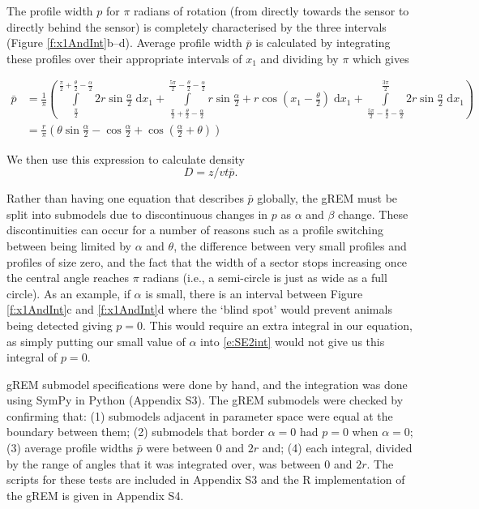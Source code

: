 \documentclass[a4paper,10pt,reqno,oneside]{amsart}
\begin{document}
The profile width $p$ for $\pi$ radians of rotation (from directly towards the sensor to directly behind the sensor) is completely characterised by the three intervals (Figure \ref{f:x1AndInt}b--d). Average profile width $\bar{p}$ is calculated by integrating these profiles over their appropriate intervals of $x_1$ and dividing by $\pi$ which gives

\begin{align}
    \bar{p} &=\frac{1}{\pi} \left(\int\limits_{\frac{\pi}{2}}^{\frac{\pi}{2} + \frac{\theta}{2} - \frac{\alpha}{2}}2 r \sin{\frac{\alpha}{2} }\;\mathrm{d}x_1+\int\limits_{\frac{\pi}{2} + \frac{\theta}{2} - \frac{\alpha}{2}}^{\frac{5 \pi}{2} - \frac{\theta}{2} - \frac{\alpha}{2}}r \sin{\frac{\alpha}{2} } + r \cos{\left (x_1 - \frac{\theta}{2} \right )}\;\mathrm{d}x_1+\int\limits_{\frac{5 \pi}{2} - \frac{\theta}{2} - \frac{\alpha}{2}}^{\frac{3 \pi}{2}}2 r \sin{\frac{\alpha}{2} }\;\mathrm{d}x_1\right) \label{e:SE2int}  \\
     &= \frac{r}{\pi} \left(\theta \sin{\frac{\alpha}{2} } - \cos{\frac{\alpha}{2} } + \cos{\left (\frac{\alpha}{2} + \theta \right )}\right) \label{e:SE2result}
\end{align}

We then use this expression to calculate density
\begin{equation}
\label{e:gas}
D = z/vt\bar{p}.
\end{equation}


Rather than having one equation that describes $\bar{p}$ globally, the gREM must be split into submodels due to discontinuous changes in $p$ as $\alpha$ and $\beta$ change. These discontinuities can occur for a number of reasons such as a profile switching between being limited by $\alpha$ and $\theta$, the difference between very small profiles and profiles of size zero, and the fact that the width of a sector stops increasing once the central angle reaches $\pi$ radians (i.e., a semi-circle is just as wide as a full circle). As an example, if $\alpha$ is small, there is an interval between Figure \ref{f:x1AndInt}c and \ref{f:x1AndInt}d where the `blind spot' would prevent animals being detected giving $p=0$. This would require an extra integral in our equation, as simply putting our small value of $\alpha$ into \ref{e:SE2int} would not give us this integral of $p=0$.

gREM submodel specifications were done by hand, and the integration was done using SymPy \citep{sympy} in Python (Appendix S3). The gREM submodels were checked by confirming that: (1) submodels adjacent in parameter space were equal at the boundary between them; (2) submodels that border $ \alpha = 0$ had $p = 0$ when $ \alpha = 0$; (3) average profile widths $\bar{p}$ were between 0 and $2r$ and; (4) each integral, divided by the range of angles that it was integrated over, was between 0 and $2r$. The scripts for these tests are included in Appendix S3 and the R \citep{R} implementation of the gREM is given in Appendix S4.  
\end{document}
